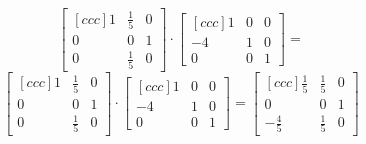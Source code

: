 \documentclass[12pt,a4paper]{article}
\begin{document}
\[
\begin{bmatrix}[ccc]
  1 & \frac{1}{5} & 0 \\
  0 & 0 & 1 \\
  0 & \frac{1}{5} & 0
\end{bmatrix} \cdot
\begin{bmatrix}[ccc]
  1 & 0 & 0 \\
  -4 & 1 & 0 \\
  0 & 0 & 1
\end{bmatrix} = 
\]
\[
\begin{bmatrix}[ccc]
  1 & \frac{1}{5} & 0 \\
  0 & 0 & 1 \\
  0 & \frac{1}{5} & 0
\end{bmatrix} \cdot
\begin{bmatrix}[ccc]
  1 & 0 & 0 \\
  -4 & 1 & 0 \\
  0 & 0 & 1
\end{bmatrix} = 
\begin{bmatrix}[ccc]
  \frac{1}{5} & \frac{1}{5} & 0 \\
  0 & 0 & 1 \\
  -\frac{4}{5} & \frac{1}{5} & 0
\end{bmatrix}
\] 
\end{document}
